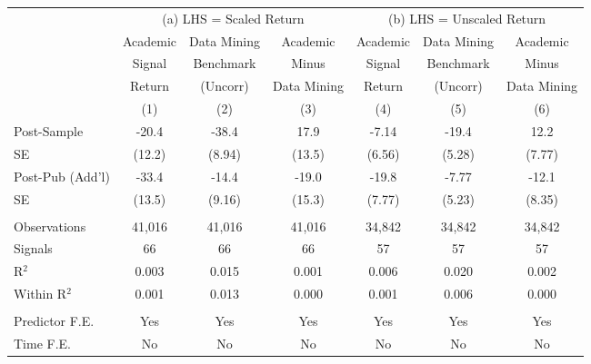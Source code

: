 \begingroup
\setlength{\tabcolsep}{0.55ex}%
\centering
\begin{tabular}{lcccccc}
   \toprule
                    & \multicolumn{3}{c}{(a) LHS = Scaled Return} & \multicolumn{3}{c}{(b) LHS = Unscaled Return} \\
   \cmidrule(lr){2-4}\cmidrule(lr){5-7}
                    & Academic
                    & Data Mining
                    & Academic
                    & Academic
                    & Data Mining
                    & Academic \\
                    & Signal
                    & Benchmark
                    & Minus
                    & Signal
                    & Benchmark
                    & Minus \\
                    & Return
                    & (Uncorr)
                    & Data Mining
                    & Return
                    & (Uncorr)
                    & Data Mining \\
                    & (1) & (2) & (3) & (4) & (5) & (6) \\
   \midrule
   Post-Sample      & -20.4 & -38.4 & 17.9 & -7.14 & -19.4 & 12.2 \\
   SE               & (12.2) & (8.94) & (13.5) & (6.56) & (5.28) & (7.77) \\
   Post-Pub (Add'l) & -33.4 & -14.4 & -19.0 & -19.8 & -7.77 & -12.1 \\
   SE               & (13.5) & (9.16) & (15.3) & (7.77) & (5.23) & (8.35) \\
   \\
   Observations     & 41,016 & 41,016 & 41,016 & 34,842 & 34,842 & 34,842 \\
   Signals          & 66 & 66 & 66 & 57 & 57 & 57 \\
   R$^2$            & 0.003 & 0.015 & 0.001 & 0.006 & 0.020 & 0.002 \\
   Within R$^2$     & 0.001 & 0.013 & 0.000 & 0.001 & 0.006 & 0.000 \\
   \\
   Predictor F.E.   & Yes & Yes & Yes & Yes & Yes & Yes \\
   Time F.E.        & No & No & No & No & No & No \\
   \bottomrule
\end{tabular}
\par\endgroup
